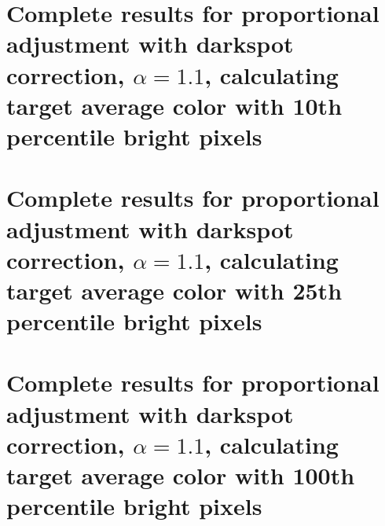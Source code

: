 \documentclass[12pt, a4paper]{article}
\begin{document}
\section{Complete results for proportional adjustment with darkspot correction, $\alpha = 1.1$, calculating target average color with 10th percentile bright pixels}\label{app:prop_corr_ave_a1p1_perc10}


\section{Complete results for proportional adjustment with darkspot correction, $\alpha = 1.1$, calculating target average color with 25th percentile bright pixels}\label{app:prop_corr_ave_a1p1_perc25}


\section{Complete results for proportional adjustment with darkspot correction, $\alpha = 1.1$, calculating target average color with 100th percentile bright pixels}\label{app:prop_corr_ave_a1p1_perc100}

\end{document}
